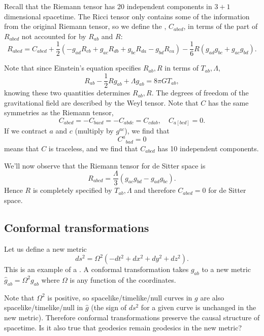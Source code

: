 \begin{defn}
Recall that the Riemann tensor has 20 independent components in $3+1$ dimensional spacetime. The Ricci tensor only contains some of the information from the original Riemann tensor, so we define the , $C_{abcd}$, in terms of the part of $R_{abcd}$ not accounted for by $R_{ab}$ and $R$:
$$R_{abcd}=C_{abcd}+\frac{1}{2}(-g_{ad}R_{cb}+g_{ac}R_{db}+g_{bc}R_{da}-g_{bd}R_{ca})-\frac{1}{6}R(g_{ad}g_{bc}+g_{ac}g_{bd}).$$%
\end{defn}
Note that since Einstein's equation specifies $R_{ab},R$ in terms of $T_{ab},\Lambda$,
$$R_{ab}-\frac{1}{2}Rg_{ab}+\Lambda g_{ab}=8\pi G T_{ab},$$
knowing these two quantities determines $R_{ab},R$. The degrees of freedom of the gravitational field are described by the Weyl tensor. Note that $C$ has the same symmetries as the Riemann tensor,
$$C_{abcd}=-C_{bacd}=-C_{abdc}=C_{cdab},\quad C_{a[bcd]}=0.$$
If we contract $a$ and $c$ (multiply by $g^{ac}$), we find that
$${C^a}_{bad}=0$$ means that $C$ is traceless, and we find that $C_{abcd}$ has 10 independent components.

We'll now observe that the Riemann tensor for de Sitter space is
$$R_{abcd}=\frac{\Lambda}{3}(g_{ac}g_{bd}-g_{ad}g_{bc}).$$
Hence $R$ is completely specified by $T_{ab},\Lambda$ and therefore $C_{abcd}=0$ for de Sitter space.

\subsection*{Conformal transformations} Let us define a new metric
$$ds^2=\Omega^2(-dt^2+dx^2+dy^2+dz^2).$$
This is an example of a . A conformal transformation takes $g_{ab}$ to a new metric $\hat g_{ab}=\Omega^2 g_{ab}$ where $\Omega$ is any function of the coordinates.

Note that $\Omega^2$ is positive, so spacelike/timelike/null curves in $g$ are also spacelike/timelike/null in $\hat g$ (the sign of $ds^2$ for a given curve is unchanged in the new metric). Therefore conformal transformations preserve the causal structure of spacetime. Is it also true that geodesics remain geodesics in the new metric?

